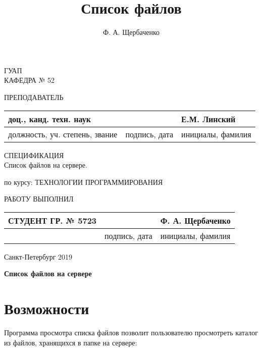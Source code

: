 \documentclass[a4paper,14pt]{extarticle} %
\author{Ф. А. Щербаченко}
\title{Список файлов}
\begin{document}
\begin{titlepage}
\begin{center}

ГУАП\\
КАФЕДРА № 52\\
\vspace{2cm}

\begin{flushleft}
ПРЕПОДАВАТЕЛЬ
\begin{tabular}{|l|l|l|}
\hline
доц., канд. техн. наук & & Е.М. Линский\\
\hline
должность, уч. степень, звание & подпись, дата & инициалы, фамилия\\
\hline
\end{tabular}
\end{flushleft}

\vspace{3cm}

{\Large СПЕЦИФИКАЦИЯ\\}
\vspace{0.3cm}
{\Large Список файлов на сервере.}

\vspace{0.7cm}

\begin{flushleft}
по курсу: ТЕХНОЛОГИИ ПРОГРАММИРОВАНИЯ
\end{flushleft}

\vspace{5cm}

\begin{flushleft}
РАБОТУ ВЫПОЛНИЛ
\begin{tabular}{|l|l|l|}
\hline
СТУДЕНТ ГР. № 5723 & & Ф. А. Щербаченко\\
\hline
& подпись, дата & инициалы, фамилия\\
\hline
\end{tabular}
\end{flushleft}

\vspace{2cm}

Санкт-Петербург 2019

\end{center}
\end{titlepage}
\renewcommand{\chaptername}{Раздел}
\renewcommand{\figurename}{Рисунок}

\begin{center}
\huge \bf Список файлов на сервере
\end{center}

\setcounter{page}{2}
\section*{Возможности}
Программа просмотра списка файлов позволит пользователю просмотреть каталог из файлов, хранящихся в папке на сервере:
\end{document}
